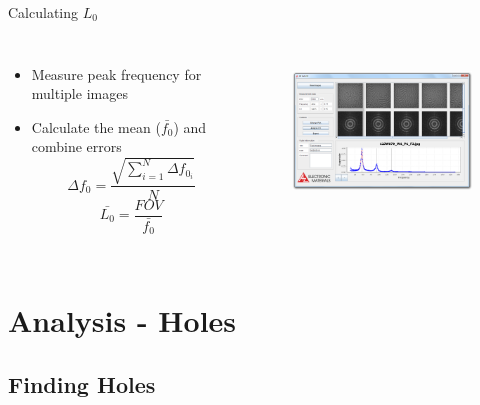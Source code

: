 \documentclass{beamer}
\begin{document}
\begin{frame}{Calculating $L_{0}$}
	\begin{columns}
		\begin{itemize}
			\item
			Measure peak frequency for multiple images
			\item
			Calculate the mean ($\bar{f_{0}}$) and combine errors
			\begin{displaymath}
			 	\Delta f_{0} = \frac{\sqrt{\sum\limits_{i=1}^N  \Delta f_{0_{i}} }}{N}
			\end{displaymath}
			\begin{displaymath}
				\bar{L_{0}} = \frac{FOV}{\bar{f_{0}}}
			\end{displaymath}
			
		\end{itemize}
			\begin{figure}
				\includegraphics[height=120pt]{images/measuring_l0.png}
			\end{figure}
			
	\end{columns}

\end{frame}

\section{Analysis - Holes}

\subsection{Finding Holes}
\end{document}

